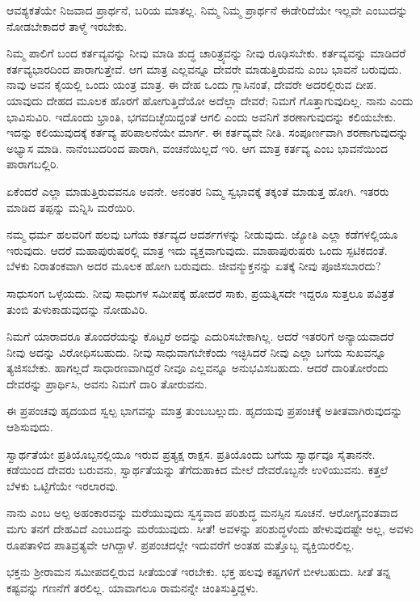 ಆವಶ್ಯಕತೆಯೇ ನಿಜವಾದ ಪ್ರಾರ್ಥನೆ, ಬರಿಯ ಮಾತಲ್ಲ. ನಿಮ್ಮ ನಿಮ್ಮ ಪ್ರಾರ್ಥನೆ ಈಡೇರಿದೆಯೇ ಇಲ್ಲವೇ ಎಂಬುದನ್ನು ನೋಡಬೇಕಾದರೆ ತಾಳ್ಮೆ ಇರಬೇಕು.

ನಿಮ್ಮ ಪಾಲಿಗೆ ಬಂದ ಕರ್ತವ್ಯವನ್ನು ನೀವು ಮಾಡಿ ಶುದ್ಧ ಚಾರಿತ್ರ್ಯವನ್ನು ನೀವು ರೂಢಿಸಬೇಕು. ಕರ್ತವ್ಯವನ್ನು ಮಾಡಿದರೆ ಕರ್ತವ್ಯಭಾರದಿಂದ ಪಾರಾಗುತ್ತೇವೆ. ಆಗ ಮಾತ್ರ ಎಲ್ಲವನ್ನೂ ದೇವರೇ ಮಾಡುತ್ತಿರುವನು ಎಂಬ ಭಾವನೆ ಬರುವುದು. ನಾವು ಅವನ ಕೈಯಲ್ಲಿ ಒಂದು ಯಂತ್ರ ಮಾತ್ರ. ಈ ದೇಹ ಒಂದು ಗ್ಲಾಸಿನಂತೆ, ದೇವರೇ ಅದರಲ್ಲಿರುವ ದೀಪ. ಯಾವುದು ದೇಹದ ಮೂಲಕ ಹೊರಗೆ ಹೋಗುತ್ತಿದೆಯೋ ಅದೆಲ್ಲಾ ದೇವರೆ; ನಿಮಗೆ ಗೊತ್ತಾಗುವುದಿಲ್ಲ. ನಾನು ಎಂದು ಭಾವಿಸುವಿರಿ. ಇದೊಂದು ಭ್ರಾಂತಿ, ಭಗವದಿಚ್ಛೆಯಿದ್ದಂತೆ ಆಗಲಿ ಎಂದು ಅವನಿಗೆ ಶರಣಾಗುವುದನ್ನು ಕಲಿಯಬೇಕು. ಇದನ್ನು ಕಲಿಯುವುದಕ್ಕೆ ಕರ್ತವ್ಯ ಪರಿಪಾಲನೆಯೇ ಮಾರ್ಗ. ಈ ಕರ್ತವ್ಯವೇ ನೀತಿ. ಸಂಪೂರ್ಣವಾಗಿ ಶರಣಾಗುವುದನ್ನು ಅಭ್ಯಾಸ ಮಾಡಿ. ನಾನೆಂಬುದರಿಂದ ಪಾರಾಗಿ, ವಂಚನೆಯಿಲ್ಲದೆ ಇರಿ. ಆಗ ಮಾತ್ರ ಕರ್ತವ್ಯ ಎಂಬ ಭಾವನೆಯಿಂದ ಪಾರಾಗಬಲ್ಲಿರಿ.

ಏಕೆಂದರೆ ಎಲ್ಲಾ ಮಾಡುತ್ತಿರುವವನೂ ಅವನೇ. ಅನಂತರ ನಿಮ್ಮ ಸ್ವಭಾವಕ್ಕೆ ತಕ್ಕಂತೆ ಮಾಡುತ್ತ ಹೋಗಿ. ಇತರರು ಮಾಡಿದ ತಪ್ಪನ್ನು ಮನ್ನಿಸಿ ಮರೆಯಿರಿ.

ನಮ್ಮ ಧರ್ಮ ಹಲವರಿಗೆ ಹಲವು ಬಗೆಯ ಕರ್ತವ್ಯದ ಆದರ್ಶಗಳನ್ನು ನೀಡುವುದು. ಜ್ಯೋತಿ ಎಲ್ಲಾ ಕಡೆಗಳಲ್ಲಿಯೂ ಇರುವುದು. ಆದರೆ ಮಹಾಪುರುಷರಲ್ಲಿ ಮಾತ್ರ ಇದು ವ್ಯಕ್ತವಾಗುವುದು. ಮಾಹಾಪುರುಷರು ಒಂದು ಸ್ಪಟಿಕದಂತೆ. ಬೆಳಕು ನಿರಾತಂಕವಾಗಿ ಅದರ ಮೂಲಕ ಹೋಗಿ ಬರುವುದು. ಜೀವನ್ಮುಕ್ತನನ್ನು ಏತಕ್ಕೆ ನೀವು ಪೂಜಿಸಬಾರದು?

ಸಾಧುಸಂಗ ಒಳ್ಳೆಯದು. ನೀವು ಸಾಧುಗಳ ಸಮೀಪಕ್ಕೆ ಹೋದರೆ ಸಾಕು, ಪ್ರಯತ್ನಿಸದೇ ಇದ್ದರೂ ಸುತ್ತಲೂ ಪವಿತ್ರತೆ ತುಂಬಿ ತುಳುಕಾಡುವುದನ್ನು ನೋಡುವಿರಿ.

ನಿಮಗೆ ಯಾರಾದರೂ ತೊಂದರೆಯನ್ನು ಕೊಟ್ಟರೆ ಅದನ್ನು ಎದುರಿಸಬೇಕಾಗಿಲ್ಲ. ಆದರೆ ಇತರರಿಗೆ ಅನ್ಯಾಯವಾದರೆ ನೀವು ಅದನ್ನು ವಿರೋಧಿಸಬಹುದು. ನೀವು ಸಾಧುವಾಗಬೇಕೆಂದು ಇಚ್ಛಿಸಿದರೆ ನೀವು ಎಲ್ಲಾ ಬಗೆಯ ಸುಖವನ್ನೂ ತ್ಯಜಿಸಬೇಕು. ಹಾಗಲ್ಲದೆ ಸಾಧಾರಣವಾಗಿದ್ದರೆ ನೀವೂ ಎಲ್ಲವನ್ನೂ ಅನುಭವಿಸಬಹುದು. ಆದರೆ ದಾರಿತೋರೆಂದು ದೇವರನ್ನು ಪ್ರಾರ್ಥಿಸಿ, ಅವನು ನಿಮಗೆ ದಾರಿ ತೋರುವನು.

ಈ ಪ್ರಪಂಚವು ಹೃದಯದ ಸ್ವಲ್ಪ ಭಾಗವನ್ನು ಮಾತ್ರ ತುಂಬಬಲ್ಲುದು. ಹೃದಯವು ಪ್ರಪಂಚಕ್ಕೆ ಅತೀತವಾಗಿರುವುದನ್ನು ಆಶಿಸುವುದು.

ಸ್ವಾರ್ಥತೆಯೇ ಪ್ರತಿಯೊಬ್ಬನಲ್ಲಿಯೂ ಇರುವ ಪ್ರತ್ಯಕ್ಷ ರಾಕ್ಷಸ. ಪ್ರತಿಯೊಂದು ಬಗೆಯ ಸ್ವಾರ್ಥವೂ ಸೈತಾನನೇ. ಕಡೆಯಿಂದ ದೇವರು ಬರುವನು, ಸ್ವಾರ್ಥತೆಯನ್ನು ತೆಗೆದುಹಾಕಿದ ಮೇಲೆ ದೇವರೊಬ್ಬನೇ ಉಳಿಯುವನು. ಕತ್ತಲೆ ಬೆಳಕು ಒಟ್ಟಿಗೆಯೇ ಇರಲಾರವು.

ನಾನು ಎಂಬ ಅಲ್ಪ ಅಹಂಕಾರವನ್ನು ಮರೆಯುವುದು ಸ್ವಸ್ಥವಾದ ಪರಿಶುದ್ಧ ಮನಸ್ಸಿನ ಸೂಚನೆ. ಆರೋಗ್ಯವಂತವಾದ ಮಗು ತನಗೆ ದೇಹವಿದೆ ಎಂಬುದನ್ನು ಮರೆಯುವುದು. ಸೀತೆ! ಅವಳನ್ನು ಪರಿಶುದ್ಧಳೆಂದು ಹೇಳುವುದಷ್ಟೇ ಅಲ್ಲ, ಅವಳು ರೂಪತಾಳಿದ ಪಾತಿವ್ರತ್ಯವೇ ಆಗಿದ್ದಾಳೆ. ಪ್ರಪಂಚದಲ್ಲೇ ಇದುವರೆಗೆ ಅಂತಹ ಮತ್ತೊಬ್ಬ ವ್ಯಕ್ತಿಯಿರಲಿಲ್ಲ.

ಭಕ್ತನು ಶ‍್ರೀರಾಮನ ಸಮೀಪದಲ್ಲಿರುವ ಸೀತೆಯಂತೆ ಇರಬೇಕು. ಭಕ್ತ ಹಲವು ಕಷ್ಟಗಳಿಗೆ ಬೀಳಬಹುದು. ಸೀತೆ ತನ್ನ ಕಷ್ಟವನ್ನು ಗಣನೆಗೆ ತರಲಿಲ್ಲ. ಯಾವಾಗಲೂ ರಾಮನನ್ನೇ ಚಿಂತಿಸುತ್ತಿದ್ದಳು.

